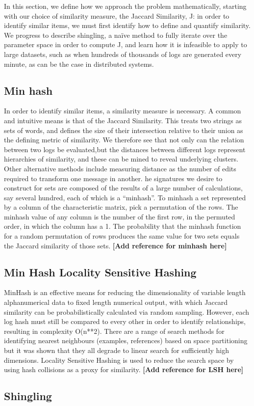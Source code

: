 In this section, we define how we approach the problem
mathematically, starting with our choice of similarity measure, the Jaccard
Similarity, J: in order to identify similar items, we must first identify how
to define and quantify similarity. We progress to describe shingling, a naïve
method to fully iterate over the parameter space in order to compute J, and
learn how it is infeasible to apply to large datasets, such as when hundreds
of thousands of logs are generated every minute, as can be the case in distributed systems.

\subsection{Min hash}\label{sec:_academic_style}
In order to identify similar items, a similarity measure is necessary. A common and intuitive means is that of the Jaccard Similarity. This treats two strings as sets of words, and defines the size of their intersection relative to their union as the defining metric of similarity. We therefore see that not only can the relation between two logs be evaluated,but the distances between different logs represent hierarchies of similarity, and these can be mined to reveal underlying clusters. Other alternative methods include measuring distance as the number of edits required to transform one message in another. he signatures we desire to construct for sets are composed of the results of a large number of calculations, say several hundred, each of which is a “minhash”. To minhash a set represented by a column of the characteristic matrix, pick
a permutation of the rows. The minhash value of any column is the number of
the first row, in the permuted order, in which the column has a 1. The probability that the minhash function for a random permutation of
rows produces the same value for two sets equals the Jaccard similarity
of those sets. \textbf{[Add reference for minhash here]}


\subsection{Min Hash Locality Sensitive Hashing}\label{sec:_tips_for_writing}

MinHash is an effective means for reducing the dimensionality of variable
length alphanumerical data to fixed length numerical output, with which
Jaccard similarity can be probabilistically calculated via random sampling.
However, each log hash must still be compared to every other in order to
identify relationships, resulting in complexity O(n**2). There are a range of
search methods for identifying nearest neighbours (examples, references)
based on space partitioning but it was shown that they all degrade to linear search for sufficiently high dimensions. Locality Sensitive Hashing
is used to reduce the search space by using hash collisions as a proxy for
similarity.  \textbf{{[Add reference for LSH here]}}

\subsection{Shingling}\label{sec:_tips_for_writing}
